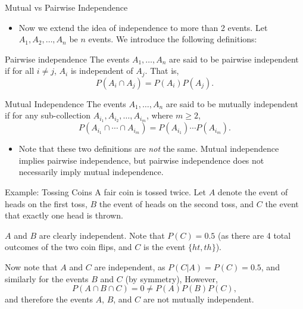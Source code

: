 \begin{frame}[allowframebreaks]{Mutual vs Pairwise Independence}
  \begin{itemize}
    \item Now we extend the idea of independence to more than 2 events. Let $A_1, A_2, \ldots, A_n$ be $n$ events. We introduce the following definitions:
  \end{itemize}

  \begin{block}{Pairwise independence}
    The events $A_1, \ldots, A_n$ are said to be \alert{pairwise independent} if for all $i \neq j$, $A_i$ is independent of $A_j$. That is,
    $$
    P(A_i \cap A_j) = P(A_i)P(A_j).
    $$
  \end{block}

  \begin{block}{Mutual Independence}
    The events $A_1, \ldots, A_n$ are said to be \alert{mutually independent} if for any sub-collection $A_{i_1}, A_{i_2}, \ldots, A_{i_m}$, where $m \geq 2$,
    $$
    P(A_{i_1} \cap \cdots \cap A_{i_m}) = P(A_{i_1})\cdots P(A_{i_m}).
    $$
  \end{block}

  \begin{itemize}
    \item Note that these two definitions are \emph{not} the same. Mutual independence implies pairwise independence, but pairwise independence does not necessarily imply mutual independence.
  \end{itemize}

  \begin{exampleblock}{Example: Tossing Coins}
    A fair coin is tossed twice. Let $A$ denote the event of heads on the first toss, $B$ the event of heads on the second toss, and $C$ the event that exactly one head is thrown.

    $A$ and $B$ are clearly independent. Note that $P(C) = 0.5$ (as there are 4 total outcomes of the two coin flips, and $C$ is the event $\{ht, th\}$).

    Now note that $A$ and $C$ are independent, as $P(C | A) = P(C) = 0.5$, and similarly for the events $B$ and $C$ (by symmetry), However,
    $$
    P(A \cap B \cap C) = 0 \neq P(A)P(B)P(C),
    $$
    and therefore the events $A$, $B$, and $C$ are not mutually independent.
  \end{exampleblock}

\end{frame}

